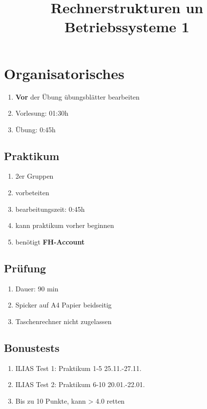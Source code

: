 \documentclass[11pt, a4paper]{article}
\begin{document}
\title{Rechnerstrukturen un Betriebssysteme 1}
\maketitle

\thispagestyle{empty}


\newpage

\tableofcontents

\newpage

\section{Organisatorisches}
\begin{enumerate}
\item \textbf{Vor} der Übung übungsblätter bearbeiten
\item Vorlesung: 01:30h
\item Übung: 0:45h
\end{enumerate}

\subsection{Praktikum}
\begin{enumerate}
\item 2er Gruppen
\item vorbeteiten
\item bearbeitungszeit: 0:45h
\item kann praktikum vorher beginnen
\item benötigt \textbf{FH-Account}
\end{enumerate}
\subsection{Prüfung}
\begin{enumerate}
\item Dauer: 90 min
\item Spicker auf A4 Papier beidseitig
\item Taschenrechner nicht zugelassen
\end{enumerate}

\subsection{Bonustests}
\begin{enumerate}
\item ILIAS Test 1: Praktikum 1-5 25.11.-27.11.
\item ILIAS Test 2: Praktikum 6-10 20.01.-22.01.
\item Bis zu 10 Punkte, kann > 4.0 retten
\end{enumerate}
\end{document}
